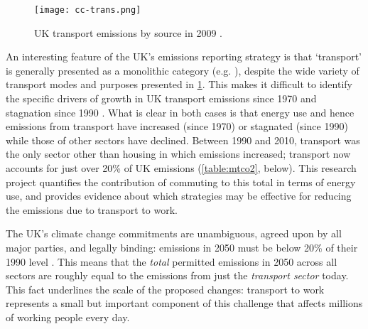 \begin{figure}[h]
 \centering
 \texttt{[image: cc-trans.png]}
 \caption{UK transport emissions by source in 2009 \citep{Decc2011t}.}
 \label{fig:cc-trans}
\end{figure}

An interesting feature of the UK's emissions reporting strategy is that
`transport' is generally presented as a monolithic category (e.g.
\citealp{Decc2010}), despite the wide variety of transport modes and purposes
presented in \cref{fig:cc-trans}. This makes it difficult to identify the
specific drivers of growth in UK transport emissions since 1970
\citep{Gasparatos2009} and stagnation since 1990 .
What is clear in
both cases is that energy use and hence emissions from transport have increased
(since 1970) or stagnated (since 1990) while those of other sectors have
declined. Between 1990 and 2010, transport was the only sector other than
housing in which emissions increased; transport now accounts for just over 20\%
of UK emissions (\cref{table:mtco2}, below). This research project quantifies
the contribution of commuting to this total in terms of energy use, and provides evidence
about which strategies may be effective for reducing the emissions due to
transport to work.

The UK's climate change commitments are unambiguous, agreed upon by all major
parties, and legally binding: emissions in 2050 must be below 20\% of their 1990
level \citep{ClimateChangeAct2008}. This means that the \emph{total}
permitted emissions in 2050 across all sectors are roughly equal to the emissions from
just the \emph{transport sector} today. This fact underlines the scale of the
proposed changes: transport to work represents a small but important component
of this challenge that affects millions of working people every day.


\begin{table}[htbp]
\caption[Top 5 UK sectors in terms of greenhouse gas emissions, 1990-2010]{Top 5
UK sectors in terms of greenhouse gas emissions, 1990-2010
(MtCO$_{2}$e). Data from \citet{Decc2011ff}}
\label{table:mtco2}
\end{table}

